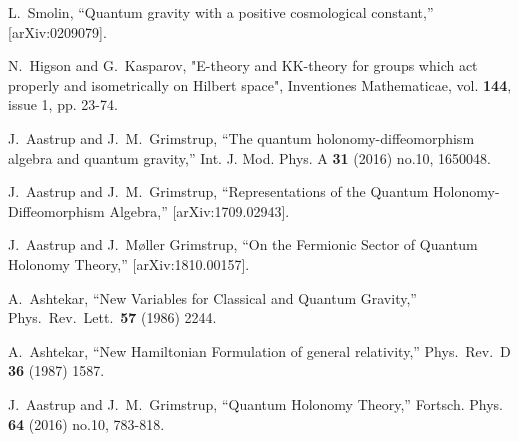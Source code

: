 \documentclass[letterpaper,12pt]{article}
\begin{document}
\begin{thebibliography}{99}
  L.~Smolin,
  ``Quantum gravity with a positive cosmological constant,''
  [arXiv:0209079].


  
N.~Higson and G.~Kasparov, "E-theory and KK-theory for groups which act properly and isometrically on Hilbert space", 
Inventiones Mathematicae, vol. {\bf 144}, issue 1, pp. 23-74.





J.~Aastrup and J.~M.~Grimstrup,
``The quantum holonomy-diffeomorphism algebra and quantum gravity,''
Int. J. Mod. Phys. A \textbf{31} (2016) no.10, 1650048.








  J.~Aastrup and J.~M.~Grimstrup,
  ``Representations of the Quantum Holonomy-Diffeomorphism Algebra,''
  [arXiv:1709.02943].

J.~Aastrup and J.~M\o{}ller Grimstrup,
``On the Fermionic Sector of Quantum Holonomy Theory,''
[arXiv:1810.00157].




  A.~Ashtekar,
  ``New Variables for Classical and Quantum Gravity,''
  Phys.\ Rev.\ Lett.\  {\bf 57} (1986) 2244.

  A.~Ashtekar,
  ``New Hamiltonian Formulation of general relativity,''
  Phys.\ Rev.\  D {\bf 36} (1987) 1587.




J.~Aastrup and J.~M.~Grimstrup,
``Quantum Holonomy Theory,''
Fortsch. Phys. \textbf{64} (2016) no.10, 783-818.









\end{thebibliography}
\end{document}
